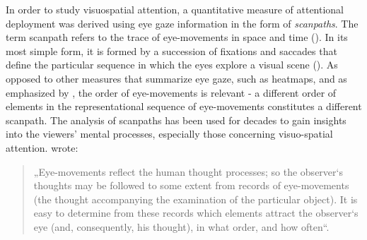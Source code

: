 \documentclass[a4paper, 12pt]{scrreprt}
\begin{document}
In order to study visuospatial attention, a quantitative measure of attentional deployment was derived using eye gaze information in the form of \textit{scanpaths}.
The term scanpath refers to the trace of eye-movements in space and time (\cite{holmqvist2011eye}). In its most simple form, it is formed by a succession of fixations and saccades that define the particular sequence in which the eyes explore a visual scene (\cite{anderson2015comparison}). As opposed to other measures that summarize eye gaze, such as heatmaps, and as  emphasized by \textcite{holmqvist2011eye}, the order of eye-movements is relevant - a different order of elements in the representational sequence of eye-movements constitutes a different scanpath. \newline
The analysis of scanpaths has been used for decades to gain insights into the viewers’ mental processes, especially those concerning visuo-spatial attention. \textcite{yarbus1967eye} wrote: 

\begin{quotation}
\footnotesize{„Eye-movements reflect the human thought processes; so the observer‘s thoughts may be followed to some extent from records of eye-movements (the thought accompanying the examination of the particular object). It is easy to determine from these records which elements attract the observer‘s eye (and, consequently, his thought), in what order, and how often“.}
\end{quotation}
\end{document}
